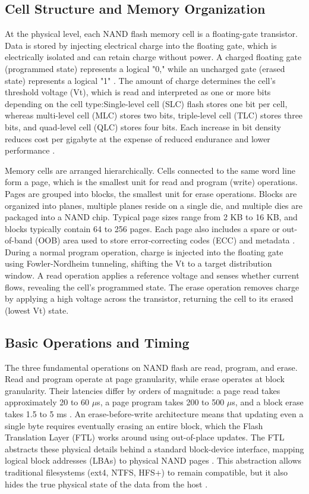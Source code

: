\subsection{Cell Structure and Memory Organization}
At the physical level, each NAND flash memory cell is a floating-gate transistor. Data is 
stored by injecting electrical charge into the floating gate, which is electrically isolated 
and can retain charge without power. A charged floating gate (programmed state) represents a 
logical "0," while an uncharged gate (erased state) represents a logical "1" \cite{homaidi2009data}.
The amount of charge determines the cell's threshold voltage (Vt), which is read and interpreted as 
one or more bits depending on the cell type:Single-level cell (SLC) flash stores one bit per cell, 
whereas multi-level cell (MLC) stores two bits, triple-level cell (TLC) stores three bits, and 
quad-level cell (QLC) stores four bits. Each increase in bit density reduces cost per gigabyte at 
the expense of reduced endurance and lower performance \cite{aronsson2025secure}.

Memory cells are arranged hierarchically. Cells connected to the same word line form a page, 
which is the smallest unit for read and program (write) operations. Pages are grouped into 
blocks, the smallest unit for erase operations. Blocks are organized into planes, multiple 
planes reside on a single die, and multiple dies are packaged into a NAND chip. Typical page 
sizes range from 2 KB to 16 KB, and blocks typically contain 64 to 256 pages\cite{aronsson2025secure}.
Each page also includes a spare or out-of-band (OOB) area used to store error-correcting codes 
(ECC) and metadata \cite{duplicateschen2022}. During a normal program operation, charge is 
injected into the floating gate using Fowler-Nordheim tunneling, shifting the Vt to a target 
distribution window. A read operation applies a reference voltage and senses whether current 
flows, revealing the cell's programmed state. The erase operation removes charge by applying a 
high voltage across the transistor, returning the cell to its erased (lowest Vt) state.

\subsection{Basic Operations and Timing}
The three fundamental operations on NAND flash are read, program, and erase. Read and program 
operate at page granularity, while erase operates at block granularity. Their latencies differ 
by orders of magnitude: a page read takes approximately 20 to 60 $\mu$s, a page program takes 200 
to 500 $\mu$s, and a block erase takes 1.5 to 5 ms \cite{aronsson2025secure,duplicateschen2022}. An 
erase-before-write architecture means that updating even a single byte requires eventually 
erasing an entire block, which the Flash Translation Layer (FTL) works around using out-of-place 
updates. The FTL abstracts these physical details behind a standard block-device interface, 
mapping logical block addresses (LBAs) to physical NAND pages \cite{onarlioglu2018_3}. This 
abstraction allows traditional filesystems (ext4, NTFS, HFS+) to remain compatible, but it also 
hides the true physical state of the data from the host \cite{aronsson2025secure}.


